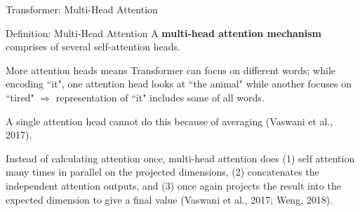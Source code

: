 \begin{frame}{Transformer: Multi-Head Attention}
    
    \begin{definitionBlock}{Definition: Multi-Head Attention}
        \footnotesize  
        A \textbf{\alert{multi-head attention mechanism}} comprises of several self-attention heads. \newline
        
         More attention heads means Transformer can focus on different words; while encoding ``it", one attention head looks at ``the animal" while another focuses on ``tired" $\Rightarrow$ representation of ``it" includes some of all words. \newline 
         
        
        A single attention head cannot do this because of averaging (Vaswani et al., 2017).
    \end{definitionBlock}
    
    \begin{itemizeSpaced}{4pt}
        \item  Instead of calculating attention once, multi-head attention does (1) self attention many times in parallel on the projected dimensions, (2) concatenates the independent attention outputs, and (3) once again projects the result into the expected dimension to give a final value (Vaswani et al., 2017; Weng, 2018).
    \end{itemizeSpaced}
    
\end{frame}





